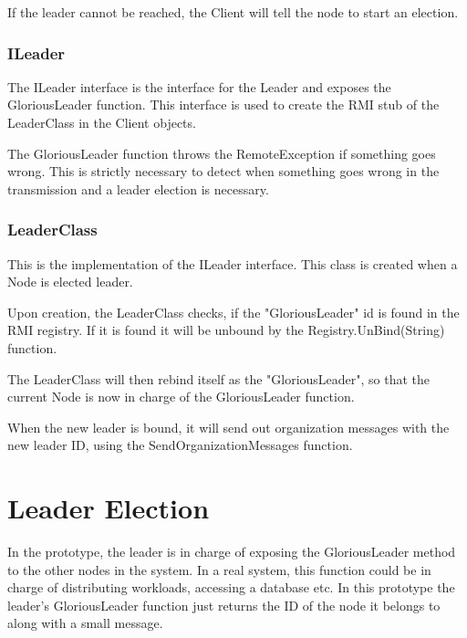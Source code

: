 If the leader cannot be reached, the Client will tell the node to start an election. 

\subsubsection{ILeader}
The ILeader interface is the interface for the Leader and exposes the GloriousLeader function. This interface is used to create the RMI stub of the LeaderClass in the Client objects.

\begin{center}
\end{center}

The GloriousLeader function throws the RemoteException if something goes wrong. This is strictly necessary to detect when something goes wrong in the transmission and a leader election is necessary.

\subsubsection{LeaderClass}
This is the implementation of the ILeader interface. This class is created when a Node is elected leader.

Upon creation, the LeaderClass checks, if the "GloriousLeader" id is found in the RMI registry. If it is found it will be unbound by the Registry.UnBind(String) function. 

The LeaderClass will then rebind itself as the "GloriousLeader", so that the current Node is now in charge of the GloriousLeader function.

\begin{center}
\end{center}

When the new leader is bound, it will send out organization messages with the new leader ID, using the SendOrganizationMessages function.

\section{Leader Election}
In the prototype, the leader is in charge of exposing the GloriousLeader method to the other nodes in the system. In a real system, this function could be in charge of distributing workloads, accessing a database etc. In this prototype the leader's GloriousLeader function just returns the ID of the node it belongs to along with a small message. 

